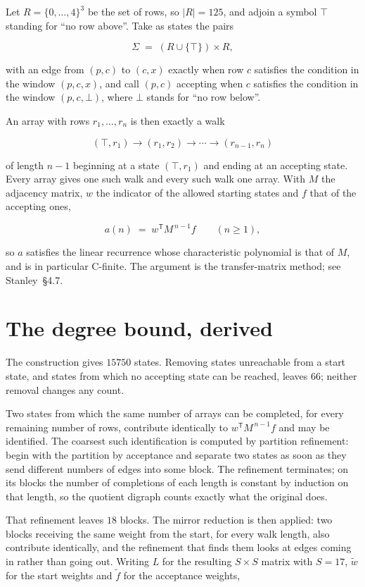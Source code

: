 \documentclass[11pt]{article}
\theoremstyle{definition}
\begin{document}
Let $R = \{0,\dots,4\}^{3}$ be the set of rows, so $|R| = 125$, and adjoin a symbol $\top$ standing for ``no row above''. Take as states the pairs

\[\Sigma \;=\; (R \cup \{\top\}) \times R,\]

with an edge from $(p,c)$ to $(c,x)$ exactly when row $c$ satisfies the condition in the window $(p,c,x)$, and call $(p,c)$ accepting when $c$ satisfies the condition in the window $(p,c,\bot)$, where $\bot$ stands for ``no row below''.

An array with rows $r_1,\dots,r_n$ is then exactly a walk

\[(\top,r_1) \to (r_1,r_2) \to \cdots \to (r_{n-1},r_n)\]

of length $n-1$ beginning at a state $(\top,r_1)$ and ending at an accepting state. Every array gives one such walk and every such walk one array. With $M$ the adjacency matrix, $w$ the indicator of the allowed starting states and $f$ that of the accepting ones,

\[a(n) \;=\; w^{\mathsf T} M^{\,n-1} f \qquad (n \ge 1),\]

so $a$ satisfies the linear recurrence whose characteristic polynomial is that of $M$, and is in particular C-finite. The argument is the transfer-matrix method; see Stanley~\S4.7.

\section{The degree bound, derived}

The construction gives $15750$ states. Removing states unreachable from a start state, and states from which no accepting state can be reached, leaves $66$; neither removal changes any count.

Two states from which the same number of arrays can be completed, for every remaining number of rows, contribute identically to $w^{\mathsf T}M^{\,n-1}f$ and may be identified. The coarsest such identification is computed by partition refinement: begin with the partition by acceptance and separate two states as soon as they send different numbers of edges into some block. The refinement terminates; on its blocks the number of completions of each length is constant by induction on that length, so the quotient digraph counts exactly what the original does.

That refinement leaves $18$ blocks. The mirror reduction is then applied: two blocks receiving the same weight from the start, for every walk length, also contribute identically, and the refinement that finds them looks at edges coming in rather than going out. Writing $L$ for the resulting $S \times S$ matrix with $S = 17$, $\tilde w$ for the start weights and $\tilde f$ for the acceptance weights,
\end{document}
